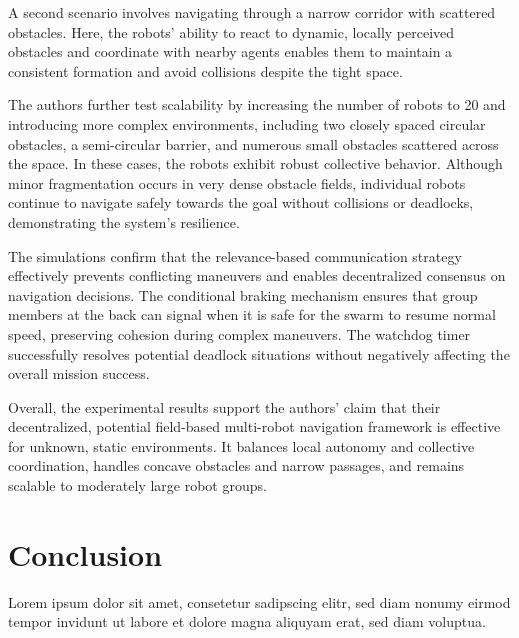 \documentclass[conference]{IEEEtran}
\begin{document}
A second scenario involves navigating through a narrow corridor with scattered obstacles. Here, the robots' ability to react to 
dynamic, locally perceived obstacles and coordinate with nearby agents enables them to maintain a consistent formation and avoid 
collisions despite the tight space.

The authors further test scalability by increasing the number of robots to 20 and introducing more complex environments, including 
two closely spaced circular obstacles, a semi-circular barrier, and numerous small obstacles scattered across the space. In these 
cases, the robots exhibit robust collective behavior. Although minor fragmentation occurs in very dense obstacle fields, individual 
robots continue to navigate safely towards the goal without collisions or deadlocks, demonstrating the system's resilience.

The simulations confirm that the relevance-based communication strategy effectively prevents conflicting maneuvers and enables 
decentralized consensus on navigation decisions. The conditional braking mechanism ensures that group members at the back can signal 
when it is safe for the swarm to resume normal speed, preserving cohesion during complex maneuvers. The watchdog timer successfully 
resolves potential deadlock situations without negatively affecting the overall mission success.

Overall, the experimental results support the authors' claim that their decentralized, potential field-based multi-robot navigation 
framework is effective for unknown, static environments. It balances local autonomy and collective coordination, handles concave 
obstacles and narrow passages, and remains scalable to moderately large robot groups.


\section{Conclusion}
Lorem ipsum dolor sit amet, consetetur sadipscing elitr, sed diam nonumy eirmod tempor invidunt ut labore et dolore magna aliquyam erat, sed diam voluptua.




\end{document}
